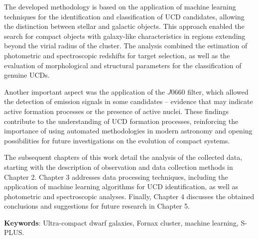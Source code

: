 The developed methodology is based on the application of machine learning techniques for the identification and classification of UCD candidates, allowing the distinction between stellar and galactic objects. This approach enabled the search for compact objects with galaxy-like characteristics in regions extending beyond the virial radius of the cluster. The analysis combined the estimation of photometric and spectroscopic redshifts for target selection, as well as the evaluation of morphological and structural parameters for the classification of genuine UCDs.

Another important aspect was the application of the $J0660$ filter, which allowed the detection of emission signals in some candidates – evidence that may indicate active formation processes or the presence of active nuclei. These findings contribute to the understanding of UCD formation processes, reinforcing the importance of using automated methodologies in modern astronomy and opening possibilities for future investigations on the evolution of compact systems.

The subsequent chapters of this work detail the analysis of the collected data, starting with the description of observation and data collection methods in Chapter 2. Chapter 3 addresses data processing techniques, including the application of machine learning algorithms for UCD identification, as well as photometric and spectroscopic analyses. Finally, Chapter 4 discusses the obtained conclusions and suggestions for future research in Chapter 5.

\textbf{Keywords}: Ultra-compact dwarf galaxies, Fornax cluster, machine learning, S-PLUS.

\thispagestyle{empty}